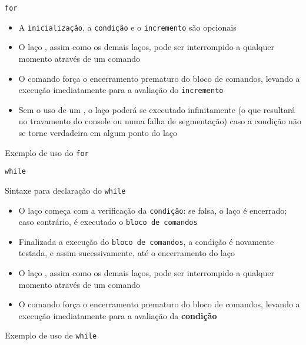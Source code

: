 \begin{frame}[fragile]{\texttt{for}}

	\begin{itemize}
		\item A {\tt inicialização}, a {\tt condição} e o 
		{\tt incremento} são opcionais

		\item O laço , assim como os demais laços, 
		pode ser interrompido a qualquer momento através de um 
		comando 

		\item O comando  força o encerramento 
		prematuro do bloco de comandos, levando a execução imediatamente para a avaliação
		do {\tt incremento}

        \item Sem o uso de um , o laço poderá se executado infinitamente
        (o que resultará no travamento do console ou numa falha de segmentação) caso a 
        condição não se torne verdadeira em algum ponto do laço
	\end{itemize}

\end{frame}


\begin{frame}[fragile]{Exemplo de uso do \texttt{for}}
\end{frame}

\begin{frame}[fragile]{\texttt{while}}

    \begin{block}{Sintaxe para declaração do \texttt{while}}
    \end{block}
	\begin{itemize}
		\item O laço  começa com a verificação da {\tt condição}: se 
        falsa, o laço é encerrado; caso contrário, é executado o \texttt{bloco de comandos} 

		\item Finalizada a execução do \texttt{bloco de comandos}, a 
		condição é novamente testada, e assim sucessivamente,
		até o encerramento do laço

		\item O laço , assim como os demais 
		laços, pode ser interrompido a qualquer momento através de 
		um comando 

		\item O comando  força o encerramento 
		prematuro do bloco de comandos, levando a execução 
		imediatamente para a avaliação da \textbf{condição}

	\end{itemize}

\end{frame}

\begin{frame}[fragile]{Exemplo de uso de \texttt{while}}
\end{frame}
